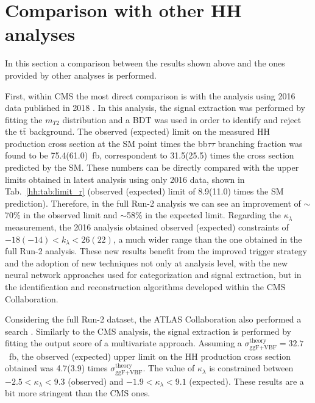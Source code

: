 \documentclass[../main.tex]{subfiles}
\begin{document}
\section{Comparison with other HH analyses}
\label{hh:sec:comparison}

In this section a comparison between the results shown above and the ones provided by other analyses is performed.

First, within CMS the most direct comparison is with the \hhbbtt{} analysis using 2016 data published in 2018 \cite{hh:analysis:2016}. In this analysis, the signal extraction was performed by fitting the $m_{T2}$ distribution \cite{hh:analysis:mt2} and a BDT was used in order to identify and reject the t$\bar{\text{t}}$ background. The observed (expected) limit on the measured HH production cross section at the SM point times the bb$\tau\tau$ branching fraction was found to be 75.4(61.0)~fb, correspondent to 31.5(25.5) times the cross section predicted by the SM. These numbers can be directly compared with the upper limits obtained in latest analysis using only 2016 data, shown in Tab.~\ref{hh:tab:limit_r} (observed (expected) limit of 8.9(11.0) times the SM prediction). Therefore, in the full Run-2 analysis we can see an improvement of $\sim$70\% in the observed limit and $\sim$58\% in the expected limit. Regarding the $\kappa_\lambda$ measurement, the 2016 analysis obtained observed (expected) constraints of $-18(-14) < k_\lambda < 26(22)$, a much wider range than the one obtained in the full Run-2 analysis. These new results benefit from the improved trigger strategy and the adoption of new techniques not only at analysis level, with the new neural network approaches used for categorization and signal extraction, but in the identification and reconstruction algorithms developed within the CMS Collaboration.

Considering the full Run-2 dataset, the ATLAS Collaboration also performed a \hhbbtt{} search \cite{hh:analysis:atlas, hh:analysis:atlas_comb}. Similarly to the CMS analysis, the signal extraction is performed by fitting the output score of a multivariate approach. Assuming a $\sigma_{\text{ggF+VBF}}^{\text{theory}}=32.7$~fb, the observed (expected) upper limit on the HH production cross section obtained was 4.7(3.9) times $\sigma_{\text{ggF+VBF}}^{\text{theory}}$. The value of $\kappa_\lambda$ is constrained between $-2.5 < \kappa_\lambda < 9.3$ (observed) and $-1.9 < \kappa_\lambda < 9.1$ (expected). These results are a bit more stringent than the CMS ones.
\end{document}
